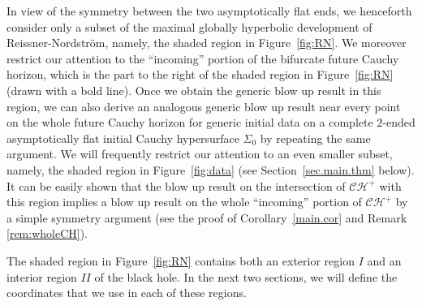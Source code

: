 \documentclass[12 pt, reqno]{amsart}
\theoremstyle{definition}
\theoremstyle{remark}
\numberwithin{equation}{section}
\newcommand{\0}{\emptyset}
\newcommand{\Sgm}{\Sigma}
\newcommand{\calC}{\mathcal C}
\newcommand{\calH}{\mathcal H}
\newcommand{\CH}{\calC \calH^{+}}		%
\begin{document}
In view of the symmetry between the two asymptotically flat ends, we henceforth consider only a subset of the maximal globally hyperbolic development of Reissner-Nordstr\"om, namely, the shaded region in Figure~\ref{fig:RN}. We moreover restrict our attention to the ``incoming'' portion of the bifurcate future Cauchy horizon, which is the part to the right of the shaded region in Figure~\ref{fig:RN} (drawn with a bold line). Once we obtain the generic blow up result in this region, we can also derive an analogous generic blow up result near every point on the whole future Cauchy horizon for generic initial data on a complete $2$-ended asymptotically flat initial Cauchy hypersurface $\Sgm_{0}$ by repeating the same argument. 
We will frequently restrict our attention to an even smaller subset, namely, the shaded region in Figure~\ref{fig:data} (see Section~\ref{sec.main.thm} below). It can be easily shown that the blow up result on the intersection of $\CH$ with this region implies a blow up result on the whole ``incoming'' portion of $\CH$ by a simple symmetry argument (see the proof of Corollary~\ref{main.cor} and Remark \ref{rem:wholeCH}).


The shaded region in Figure~\ref{fig:RN} contains both an exterior region $I$ and an interior region $II$ of the black hole. In the next two sections, we will define the coordinates that we use in each of these regions.
\end{document}
